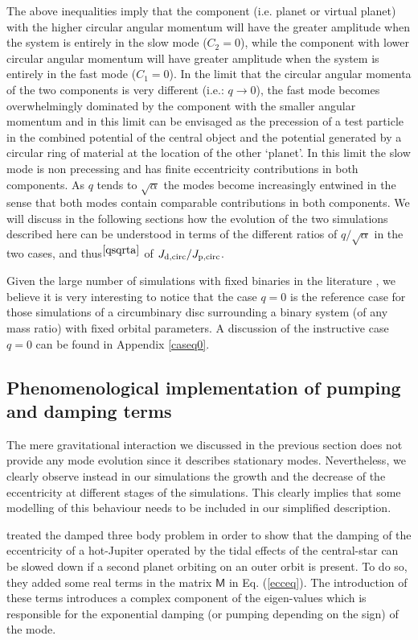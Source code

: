 \documentclass[usenatbib,a4paper,times,fleqn]{mnras}
\begin{document}
The above inequalities imply that the component (i.e. planet or virtual planet) with the higher circular angular momentum will have the greater amplitude when the system is entirely in the slow mode ($C_2=0$), while the component with lower circular angular momentum will have greater amplitude when the system is entirely in the fast mode ($C_1=0$).
In the limit that the circular angular momenta of the two components is very different (i.e.: $q\rightarrow 0$), the fast mode becomes overwhelmingly dominated by the component with the smaller angular momentum and in this limit can be envisaged as the precession of a test particle in the combined potential of the central object and the potential generated by a circular ring of material at the location of the other `planet'. In this limit the slow mode is non precessing and has finite eccentricity contributions in both components. As $q$ tends to $\sqrt{\alpha}$ the modes become increasingly entwined in the sense that both modes contain comparable contributions in both components. We will discuss in the following sections how the evolution of the two simulations described here can be understood in terms of the different ratios of $q/\sqrt{\alpha}$ in the two cases, and thus$^{\ref{qsqrta}}$ of $J_{\rm d,circ}/J_{\rm p,circ}$.

Given the large number of simulations with fixed binaries in the literature \citep{dangelo2006,muller2013,duffell2015,thun2017}, we believe it is very interesting to notice that the case $q=0$ is the reference case for those simulations of a circumbinary disc surrounding a binary system (of any mass ratio) with fixed orbital parameters. A discussion of the instructive case $q=0$ can be found in Appendix \ref{caseq0}. 


\subsection{Phenomenological implementation of pumping and damping terms}

The mere gravitational interaction we discussed in the previous section does not provide any mode evolution since it describes stationary modes. Nevertheless, we clearly observe instead in our simulations the growth and the decrease of the eccentricity at different stages of the simulations. This clearly implies that some modelling of this behaviour needs to be included in our simplified description.

\citet{zhang2013} treated the damped three body problem in order to show that the damping of the eccentricity of a hot-Jupiter operated by the tidal effects of the central-star can be slowed down if a second planet orbiting on an outer orbit is present. To do so, they added some real terms in the matrix $\bm{\mathsf{M}}$ in Eq. (\ref{ecceq}). The introduction of these terms introduces a complex component of the eigen-values which is responsible for the exponential damping (or pumping depending on the sign) of the mode. 
\end{document}
